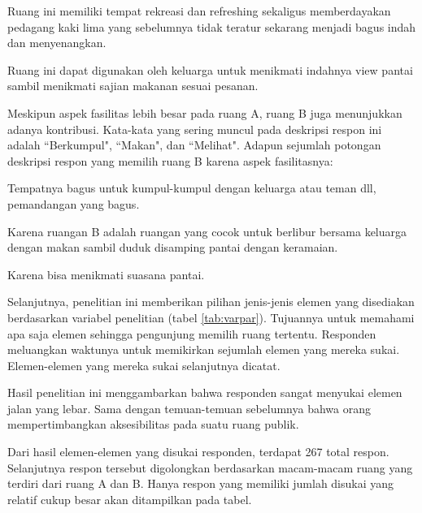 \documentclass[11pt]{simartadv} %
\begin{document}
\begin{quoting}
    Ruang ini memiliki tempat rekreasi dan refreshing sekaligus memberdayakan pedagang kaki lima yang sebelumnya tidak teratur sekarang menjadi bagus indah dan menyenangkan.
\end{quoting}

\begin{quoting}
    Ruang ini dapat digunakan oleh keluarga untuk menikmati indahnya view pantai sambil menikmati sajian makanan sesuai pesanan.
\end{quoting}

Meskipun aspek fasilitas lebih besar pada ruang A, ruang B juga menunjukkan adanya kontribusi. Kata-kata yang sering muncul pada deskripsi respon ini adalah ``Berkumpul", ``Makan", dan ``Melihat". Adapun sejumlah potongan deskripsi respon yang memilih ruang B karena aspek fasilitasnya:

\begin{quoting}
    Tempatnya bagus untuk kumpul-kumpul dengan keluarga atau teman dll, pemandangan yang bagus.
\end{quoting}

\begin{quoting}
   Karena ruangan B adalah ruangan yang cocok untuk berlibur bersama keluarga dengan makan sambil duduk disamping pantai dengan keramaian.
\end{quoting}

\begin{quoting}
    Karena bisa menikmati suasana pantai.
\end{quoting}

Selanjutnya, penelitian ini memberikan pilihan jenis-jenis elemen yang disediakan berdasarkan variabel penelitian (tabel \ref{tab:varpar}). Tujuannya untuk memahami apa saja elemen sehingga pengunjung memilih ruang tertentu. Responden meluangkan waktunya untuk memikirkan sejumlah elemen yang mereka sukai. Elemen-elemen yang mereka sukai selanjutnya dicatat.

Hasil penelitian ini menggambarkan bahwa responden sangat menyukai elemen jalan yang lebar. Sama dengan temuan-temuan sebelumnya bahwa orang mempertimbangkan aksesibilitas pada suatu ruang publik.

Dari hasil elemen-elemen yang disukai responden, terdapat 267 total respon. Selanjutnya respon tersebut digolongkan berdasarkan macam-macam ruang yang terdiri dari ruang A dan B. Hanya respon yang memiliki jumlah disukai yang relatif cukup besar akan ditampilkan pada tabel.
\end{document}
